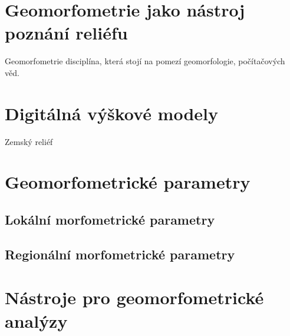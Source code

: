 \section{Geomorfometrie jako nástroj poznání reliéfu}
Geomorfometrie disciplína, která stojí na pomezí geomorfologie, počítačových věd.

\section{Digitálná výškové modely}
Zemský reliéf 




\section{Geomorfometrické parametry}
\subsection{Lokální morfometrické parametry}
\subsection{Regionální morfometrické parametry}
\section{Nástroje pro geomorfometrické analýzy}